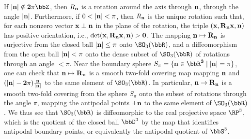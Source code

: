 \begin{example}
    If $|\bf{n}|\notin 2\pi\bbZ$, then $R_{\bf{n}}$ is a rotation around the axis through $\bf{n}$, through the angle $|\bf{n}|$. Furthermore, if $0<|\bf{n}|<\pi$, then $R_{\bf{n}}$ is the unique rotation such that, for each nonzero vector $\bf{x}\perp \bf{n}$ in the plane of the rotation, the triple $(\bf{x},R_{\bf{n}} \bf{x},\bf{n})$ has positive orientation, i.e., $\det (\bf{x},R_{\bf{n}} \bf{x},\bf{n})>0$. The mapping $\bf{n}\mapsto R_{\bf{n}}$ is surjective from the closed ball $|\bf{n}|\leq \pi$ onto $\SO_3(\bbR)$, and a diffeomorphism from the open ball $|\bf{n}|<\pi$ onto the dense subset of $\SO_3(\bbR)$ of rotations through an angle $<\pi$. Near the boundary sphere $S_\pi=\{\bf{n}\in\bbR^3\mid |\bf{n}|=\pi\}$, one can check that $\bf{n}\mapsto R_{\bf{n}}$ is a smooth two-fold covering map mapping $\bf{n}$ and $(|\bf{n}|-2\pi)\frac{\bf{n}}{|\bf{n}|}$ to the same element of $\SO_3(\bbR)$. In particular, $\bf{n}\to R_{\bf{n}}$ is a smooth two-fold covering from the sphere $S_\pi$ onto the subset of rotations through the angle $\pi$, mapping the antipodal points $\pm \bf{n}$ to the same element of $\SO_3(\bbR)$. We thus see that $\SO_3(\bbR)$ is diffeomorphic to the real projective space $\RP^3$, which is the quotient of the closed ball $\bbD^3$ by the map that identifies antipodal boundary points, or equivalently the antipodal quotient of $\bbS^3$.
    

\end{example}
